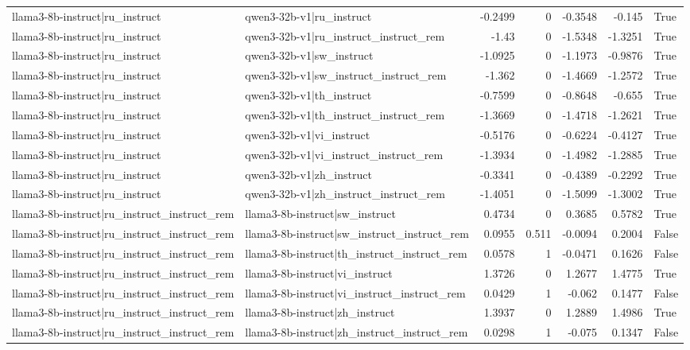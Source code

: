 \begin{table}
\begin{tabular}{l l r r r r l}
llama3-8b-instruct|ru_instruct & qwen3-32b-v1|ru_instruct & -0.2499 & 0 & -0.3548 & -0.145 & True \\
llama3-8b-instruct|ru_instruct & qwen3-32b-v1|ru_instruct_instruct_rem & -1.43 & 0 & -1.5348 & -1.3251 & True \\
llama3-8b-instruct|ru_instruct & qwen3-32b-v1|sw_instruct & -1.0925 & 0 & -1.1973 & -0.9876 & True \\
llama3-8b-instruct|ru_instruct & qwen3-32b-v1|sw_instruct_instruct_rem & -1.362 & 0 & -1.4669 & -1.2572 & True \\
llama3-8b-instruct|ru_instruct & qwen3-32b-v1|th_instruct & -0.7599 & 0 & -0.8648 & -0.655 & True \\
llama3-8b-instruct|ru_instruct & qwen3-32b-v1|th_instruct_instruct_rem & -1.3669 & 0 & -1.4718 & -1.2621 & True \\
llama3-8b-instruct|ru_instruct & qwen3-32b-v1|vi_instruct & -0.5176 & 0 & -0.6224 & -0.4127 & True \\
llama3-8b-instruct|ru_instruct & qwen3-32b-v1|vi_instruct_instruct_rem & -1.3934 & 0 & -1.4982 & -1.2885 & True \\
llama3-8b-instruct|ru_instruct & qwen3-32b-v1|zh_instruct & -0.3341 & 0 & -0.4389 & -0.2292 & True \\
llama3-8b-instruct|ru_instruct & qwen3-32b-v1|zh_instruct_instruct_rem & -1.4051 & 0 & -1.5099 & -1.3002 & True \\
llama3-8b-instruct|ru_instruct_instruct_rem & llama3-8b-instruct|sw_instruct & 0.4734 & 0 & 0.3685 & 0.5782 & True \\
llama3-8b-instruct|ru_instruct_instruct_rem & llama3-8b-instruct|sw_instruct_instruct_rem & 0.0955 & 0.511 & -0.0094 & 0.2004 & False \\
llama3-8b-instruct|ru_instruct_instruct_rem & llama3-8b-instruct|th_instruct_instruct_rem & 0.0578 & 1 & -0.0471 & 0.1626 & False \\
llama3-8b-instruct|ru_instruct_instruct_rem & llama3-8b-instruct|vi_instruct & 1.3726 & 0 & 1.2677 & 1.4775 & True \\
llama3-8b-instruct|ru_instruct_instruct_rem & llama3-8b-instruct|vi_instruct_instruct_rem & 0.0429 & 1 & -0.062 & 0.1477 & False \\
llama3-8b-instruct|ru_instruct_instruct_rem & llama3-8b-instruct|zh_instruct & 1.3937 & 0 & 1.2889 & 1.4986 & True \\
llama3-8b-instruct|ru_instruct_instruct_rem & llama3-8b-instruct|zh_instruct_instruct_rem & 0.0298 & 1 & -0.075 & 0.1347 & False \\

\end{tabular}
\end{table}
